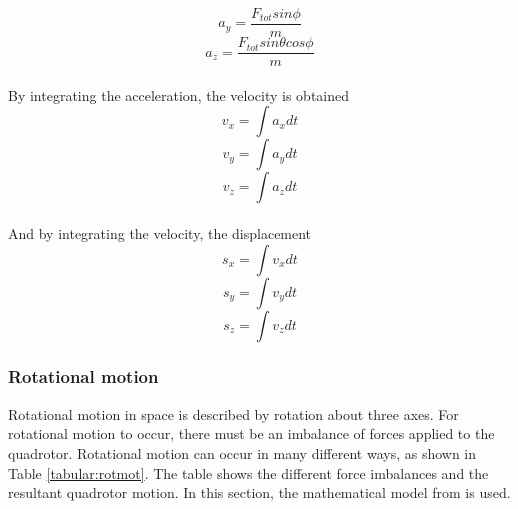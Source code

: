 \begin{equation}
a_y = \frac{F_{tot}sin\phi}{m}
\end{equation}
\begin{equation}
a_z = \frac{F_{tot}sin\theta cos\phi}{m}
\end{equation}
\\
By integrating the acceleration, the velocity is obtained
\begin{equation}
v_x = \int a_xdt
\end{equation}
\begin{equation}
v_y = \int a_ydt
\end{equation}
\begin{equation}
v_z = \int a_zdt
\end{equation}
\\
And by integrating the velocity, the displacement
\begin{equation}
s_x = \int v_xdt
\end{equation}
\begin{equation}
s_y = \int v_ydt
\end{equation}
\begin{equation}
s_z = \int v_zdt
\end{equation}
\clearpage

\subsubsection{Rotational motion}
Rotational motion in space is described by rotation about three axes. For rotational motion to occur, there must be an imbalance of forces applied to the quadrotor. Rotational motion can occur in many different ways, as shown in Table \ref{tabular:rotmot}. The table shows the different force imbalances and the resultant quadrotor motion. In this section, the mathematical model from \cite{charlesdarwinuni} is used. \\\\


